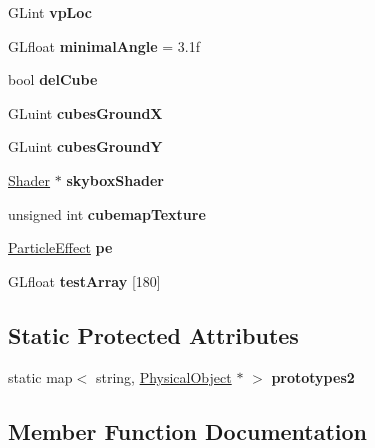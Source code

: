 \begin{DoxyCompactItemize}
G\+Lint {\bfseries vp\+Loc}
\item 
\mbox{\label{class_game_a41c1bc5aa27868a6c8ba71c324c28a44}} 
G\+Lfloat {\bfseries minimal\+Angle} = 3.\+1f
\item 
\mbox{\label{class_game_a3f5ea3e9114d4e5415cbacbf39d953e2}} 
bool {\bfseries del\+Cube}
\item 
\mbox{\label{class_game_afe9311891ae21f4cb9bff1663fb3aa6e}} 
G\+Luint {\bfseries cubes\+GroundX}
\item 
\mbox{\label{class_game_a3a547f392d07c22db054f60dc8f73ef5}} 
G\+Luint {\bfseries cubes\+GroundY}
\item 
\mbox{\label{class_game_a22b2663a0d329b215a0113cbd05cd72d}} 
\hyperlink{class_shader}{Shader} $\ast$ {\bfseries skybox\+Shader}
\item 
\mbox{\label{class_game_ab29ea0298cf4c538b8572b75f6e20582}} 
unsigned int {\bfseries cubemap\+Texture}
\item 
\mbox{\label{class_game_aac1cbeff4429c8e8ea3f4947839f447c}} 
\hyperlink{class_particle_effect}{Particle\+Effect} {\bfseries pe}
\item 
\mbox{\label{class_game_accb856425123f60508b6a5102c049ba0}} 
G\+Lfloat {\bfseries test\+Array} \mbox{[}180\mbox{]}
\end{DoxyCompactItemize}
\subsection*{Static Protected Attributes}
\begin{DoxyCompactItemize}
\item 
\mbox{\label{class_game_a5da7e2bdc907ebe2d179427a5563fb7a}} 
static map$<$ string, \hyperlink{class_physical_object}{Physical\+Object} $\ast$ $>$ {\bfseries prototypes2}
\end{DoxyCompactItemize}


\subsection{Member Function Documentation}
\mbox{\label{class_game_a62e1c1e74cccf1ecb4afe50495dfd521}} 

